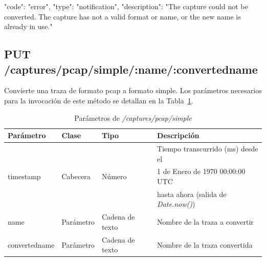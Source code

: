 \begin{itemize}
{\begin{minipage}{\textwidth}
\begin{code}[language=json]
{
  "code": "error",
  "type": "notification",
  "description": "The capture could not be converted. The capture has not a valid format or name, or the new name is already in use."
}
\end{code}
\end{minipage}
}
\end{itemize}

%
%
\subsection{PUT /captures/pcap/simple/:name/:convertedname}
Convierte una \gls{traza} de formato \gls{pcap} a formato \gls{simple}.
Los parámetros necesarios para la invocación de este método se detallan en la Tabla~\ref{extra:api:capturespcapsimple:invocacion}.

\begin{table}[H]
\centering
\begin{tabular}{|l|l|l|l|}
\hline
\rowcolor[HTML]{F5F5F5}
\textbf{Parámetro}  & \textbf{Clase} & \textbf{Tipo}   & \textbf{Descripción}                        \\ \hline
                    &                &                 & Tiempo transcurrido (ms) desde el           \\
timestamp           & Cabecera       & Número          & 1 de Enero de 1970 00:00:00 UTC             \\
                    &                &                 & hasta ahora (salida de \textit{Date.now()}) \\ \hline
name                & Parámetro      & Cadena de texto & Nombre de la \gls{traza} a convertir        \\ \hline
convertedname       & Parámetro      & Cadena de texto & Nombre de la \gls{traza} convertida         \\ \hline
\end{tabular}
\caption{Parámetros de \textit{/captures/pcap/simple}}
\label{extra:api:capturespcapsimple:invocacion}
\end{table}

